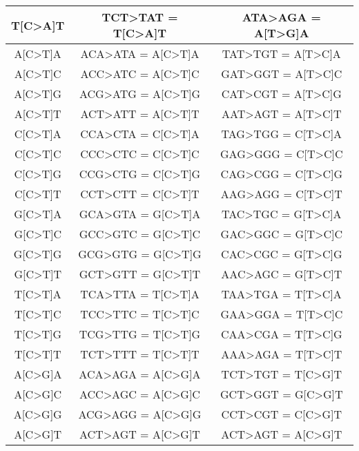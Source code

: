 \begin{longtable}{c|c|c}
\ttfamily T[C>A]T & \ttfamily TCT>TAT = T[C>A]T & \ttfamily ATA>AGA = A[T>G]A \\ \hline
\ttfamily A[C>T]A & \ttfamily ACA>ATA = A[C>T]A & \ttfamily TAT>TGT = A[T>C]A \\ \hline
\ttfamily A[C>T]C & \ttfamily ACC>ATC = A[C>T]C & \ttfamily GAT>GGT = A[T>C]C \\ \hline
\ttfamily A[C>T]G & \ttfamily ACG>ATG = A[C>T]G & \ttfamily CAT>CGT = A[T>C]G \\ \hline
\ttfamily A[C>T]T & \ttfamily ACT>ATT = A[C>T]T & \ttfamily AAT>AGT = A[T>C]T \\ \hline
\ttfamily C[C>T]A & \ttfamily CCA>CTA = C[C>T]A & \ttfamily TAG>TGG = C[T>C]A \\ \hline
\ttfamily C[C>T]C & \ttfamily CCC>CTC = C[C>T]C & \ttfamily GAG>GGG = C[T>C]C \\ \hline
\ttfamily C[C>T]G & \ttfamily CCG>CTG = C[C>T]G & \ttfamily CAG>CGG = C[T>C]G \\ \hline
\ttfamily C[C>T]T & \ttfamily CCT>CTT = C[C>T]T & \ttfamily AAG>AGG = C[T>C]T \\ \hline
\ttfamily G[C>T]A & \ttfamily GCA>GTA = G[C>T]A & \ttfamily TAC>TGC = G[T>C]A \\ \hline
\ttfamily G[C>T]C & \ttfamily GCC>GTC = G[C>T]C & \ttfamily GAC>GGC = G[T>C]C \\ \hline
\ttfamily G[C>T]G & \ttfamily GCG>GTG = G[C>T]G & \ttfamily CAC>CGC = G[T>C]G \\ \hline
\ttfamily G[C>T]T & \ttfamily GCT>GTT = G[C>T]T & \ttfamily AAC>AGC = G[T>C]T \\ \hline
\ttfamily T[C>T]A & \ttfamily TCA>TTA = T[C>T]A & \ttfamily TAA>TGA = T[T>C]A \\ \hline
\ttfamily T[C>T]C & \ttfamily TCC>TTC = T[C>T]C & \ttfamily GAA>GGA = T[T>C]C \\ \hline
\ttfamily T[C>T]G & \ttfamily TCG>TTG = T[C>T]G & \ttfamily CAA>CGA = T[T>C]G \\ \hline
\ttfamily T[C>T]T & \ttfamily TCT>TTT = T[C>T]T & \ttfamily AAA>AGA = T[T>C]T \\ \hline
\ttfamily A[C>G]A & \ttfamily ACA>AGA = A[C>G]A & \ttfamily TCT>TGT = T[C>G]T \\ \hline
\ttfamily A[C>G]C & \ttfamily ACC>AGC = A[C>G]C & \ttfamily GCT>GGT = G[C>G]T \\ \hline
\ttfamily A[C>G]G & \ttfamily ACG>AGG = A[C>G]G & \ttfamily CCT>CGT = C[C>G]T \\ \hline
\ttfamily A[C>G]T & \ttfamily ACT>AGT = A[C>G]T & \ttfamily ACT>AGT = A[C>G]T \\ \hline

\end{longtable}

